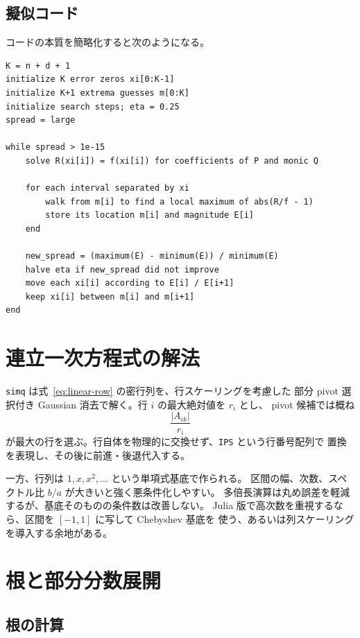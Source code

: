 \documentclass[a4paper,11pt]{ltjsarticle}
\newcommand{\code}[1]{\texttt{#1}}
\begin{document}
\subsection{擬似コード}

コードの本質を簡略化すると次のようになる。

\begin{verbatim}
K = n + d + 1
initialize K error zeros xi[0:K-1]
initialize K+1 extrema guesses m[0:K]
initialize search steps; eta = 0.25
spread = large

while spread > 1e-15
    solve R(xi[i]) = f(xi[i]) for coefficients of P and monic Q

    for each interval separated by xi
        walk from m[i] to find a local maximum of abs(R/f - 1)
        store its location m[i] and magnitude E[i]
    end

    new_spread = (maximum(E) - minimum(E)) / minimum(E)
    halve eta if new_spread did not improve
    move each xi[i] according to E[i] / E[i+1]
    keep xi[i] between m[i] and m[i+1]
end
\end{verbatim}

\section{連立一次方程式の解法}

\code{simq} は式~\eqref{eq:linear-row} の密行列を、行スケーリングを考慮した
部分 pivot 選択付き Gaussian 消去で解く。行 \(i\) の最大絶対値を \(r_i\) とし、
pivot 候補では概ね
\begin{equation}
  \frac{|A_{ik}|}{r_i}
\end{equation}
が最大の行を選ぶ。行自体を物理的に交換せず、\code{IPS} という行番号配列で
置換を表現し、その後に前進・後退代入する。

一方、行列は \(1,x,x^2,\ldots\) という単項式基底で作られる。
区間の幅、次数、スペクトル比 \(b/a\) が大きいと強く悪条件化しやすい。
多倍長演算は丸め誤差を軽減するが、基底そのものの条件数は改善しない。
Julia 版で高次数を重視するなら、区間を \([-1,1]\) に写して Chebyshev 基底を
使う、あるいは列スケーリングを導入する余地がある。

\section{根と部分分数展開}

\subsection{根の計算}
\end{document}
